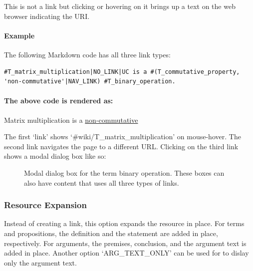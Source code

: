 \documentclass[a4paper]{article}
\begin{document}
This is not a link but clicking or hovering on it brings up a text on the web browser indicating the URI.

\paragraph{Example}
The following Markdown code has all three link types:
\begin{verbatim}
#T_matrix_multiplication|NO_LINK|UC is a #(T_commutative_property, 
'non-commutative'|NAV_LINK) #T_binary_operation.
\end{verbatim}

\paragraph{The above code is rendered as:}
\begin{mdframed}
Matrix multiplication is a \underline{non-commutative} 
\end{mdframed}
The first `link' shows `\#wiki/T\_matrix\_multiplication' on mouse-hover. The second link navigates the page to a different URL. Clicking on the third link shows a modal dialog box like so:

\begin{figure}[ht]
\begin{center}
\caption{Modal dialog box for the term binary operation. These boxes can also have content that uses all three types of links. }
\label{fig1}
\end{center}
\end{figure}

\subsubsection{Resource Expansion}

Instead of creating a link, this option expands the resource in place. For terms and propositions, the definition and the statement are added in place, respectively. For arguments, the premises, conclusion, and the argument text is added in place. Another option `ARG\_TEXT\_ONLY' can be used for to dislay only the argument text.
\end{document}
